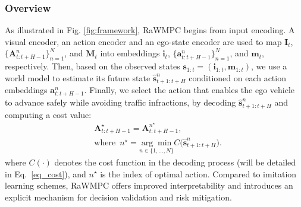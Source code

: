 \documentclass[twocolumn]{template}
\theoremstyle{thmstyleone}%
\theoremstyle{thmstyletwo}%
\theoremstyle{thmstylethree}%
\begin{document}
\subsubsection{Overview}
As illustrated in Fig. \ref{fig:framework},
RaWMPC begins from input encoding.
A visual encoder, an action encoder and an ego-state encoder are used to map $\mathbf{I}_t$, $\{\mathbf{A}^{n}_{t:t+H-1}\}_{n=1}^{N}$,
and $\mathbf{M}_t$ into embeddings $\mathbf{i}_t$, $\{\mathbf{a}^{n}_{t:t+H-1}\}_{n=1}^{N}$, and $\mathbf{m}_t$, respectively.
Then, based on the observed states $\mathbf{s}_{1:t}\!=\!(\mathbf{i}_{1:t},\mathbf{m}_{1:t}\!)$,
we use a world model to estimate its future state $\hat{\mathbf{s}}^{n}_{t+1:t+H}$ conditioned on each action embeddings $\mathbf{a}^{n}_{t:t+H-1}$.
Finally, we select the action that enables the ego vehicle to advance safely while avoiding traffic infractions, by decoding $\hat{\mathbf{s}}^{n}_{t+1:t+H}$ and computing a cost value:
\begin{equation}
\begin{aligned}
\label{eq:action_selection}
&\mathbf{A}^{\star}_{t:t+H-1} = \mathbf{A}^{n^\star}_{t:t+H-1}, \\
&\text{where}\,\,\, n^\star = \underset{n\in\{1,\dots,N\}}{\arg\min} C\!\big(\hat{\mathbf{s}}^{n}_{t+1:t+H}\big).
\end{aligned}
\end{equation}
where $C(\cdot)$ denotes the cost function in the decoding process (will be detailed in Eq.~\eqref{eq_cost}),
and $n^\star$ is the index of optimal action.
Compared to imitation learning schemes,
RaWMPC offers improved interpretability and introduces an explicit mechanism for decision validation and risk mitigation.

\end{document}
